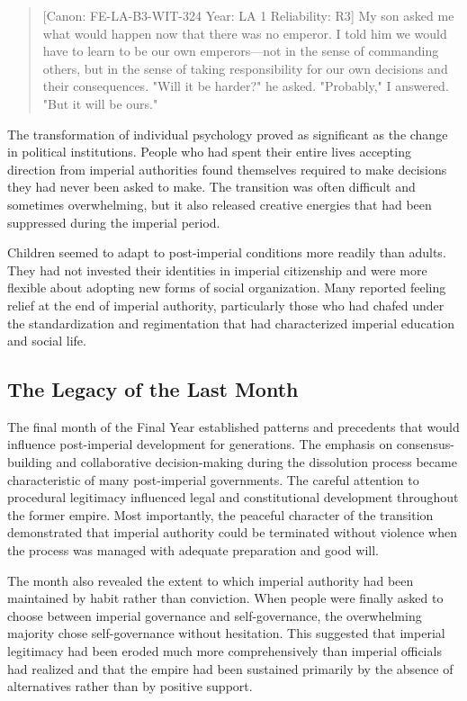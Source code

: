 \begin{quote}
{[}Canon: FE-LA-B3-WIT-324 \textbar{} Year: LA 1 \textbar{} Reliability:
R3{]} My son asked me what would happen now that there was no emperor. I
told him we would have to learn to be our own emperors---not in the
sense of commanding others, but in the sense of taking responsibility
for our own decisions and their consequences. "Will it be harder?" he
asked. "Probably," I answered. "But it will be ours."
\end{quote}

The transformation of individual psychology proved as significant as the
change in political institutions. People who had spent their entire
lives accepting direction from imperial authorities found themselves
required to make decisions they had never been asked to make. The
transition was often difficult and sometimes overwhelming, but it also
released creative energies that had been suppressed during the imperial
period.

Children seemed to adapt to post-imperial conditions more readily than
adults. They had not invested their identities in imperial citizenship
and were more flexible about adopting new forms of social organization.
Many reported feeling relief at the end of imperial authority,
particularly those who had chafed under the standardization and
regimentation that had characterized imperial education and social life.

\subsection{The Legacy of the Last
Month}\label{the-legacy-of-the-last-month}

The final month of the Final Year established patterns and precedents
that would influence post-imperial development for generations. The
emphasis on consensus-building and collaborative decision-making during
the dissolution process became characteristic of many post-imperial
governments. The careful attention to procedural legitimacy influenced
legal and constitutional development throughout the former empire. Most
importantly, the peaceful character of the transition demonstrated that
imperial authority could be terminated without violence when the process
was managed with adequate preparation and good will.

The month also revealed the extent to which imperial authority had been
maintained by habit rather than conviction. When people were finally
asked to choose between imperial governance and self-governance, the
overwhelming majority chose self-governance without hesitation. This
suggested that imperial legitimacy had been eroded much more
comprehensively than imperial officials had realized and that the empire
had been sustained primarily by the absence of alternatives rather than
by positive support.

